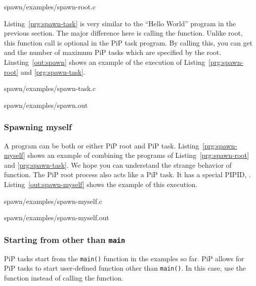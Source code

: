  {spawn/examples/spawn-root.c}

Listing~\ref{prg:spawn-task} is very similar to the ``Hello World''
program in the previous section. The major difference here is calling
the  function. Unlike root, this function call is
optional in the PiP task program. By calling this, you can get 
{\PIPID} and the number of maximum PiP tasks which are specified by the
root. Linsting~\ref{out:spawn} shows an example of the execution of
Listing~\ref{prg:spawn-root} and \ref{prg:spawn-task}. 


                {spawn/examples/spawn-task.c}


                {spawn/examples/spawn.out}

\subsubsection{Spawning myself}

A program can be both or either PiP root and PiP
task. Listing~\ref{prg:spawn-myself} shows an example of combining the
programs of Listing~\ref{prg:spawn-root} and \ref{prg:spawn-task}. We
hope you can understand the strange behavior of 
function. The PiP root process also acts like a PiP task. It has a
special PIPID, . 
Listing~\ref{out:spawn-myself} shows the example of this
execution. 


                {spawn/examples/spawn-myself.c}


                {spawn/examples/spawn-myself.out}

\subsubsection{Starting from other than {\tt main}}\label{sec:spawn-func}

PiP tasks start from the {\tt main()} function in the examples so
far. PiP allows for PiP tasks to start user-defined function other
than {\tt main()}. In this case, use the 
function instead of calling the  function.


